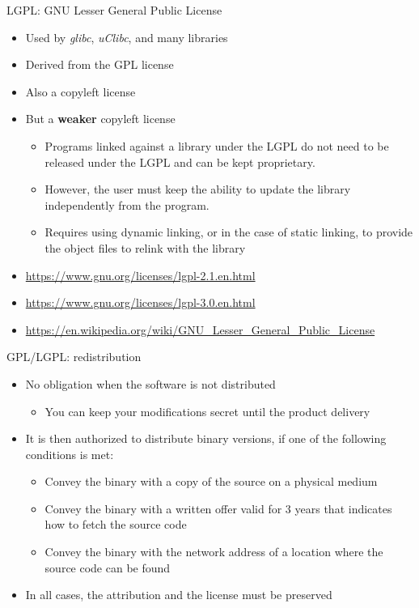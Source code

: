 \begin{frame}{LGPL: GNU Lesser General Public License}
  \begin{itemize}
  \item Used by {\em glibc}, {\em uClibc}, and many libraries
  \item Derived from the GPL license
  \item Also a copyleft license
  \item But a {\bf weaker} copyleft license
    \begin{itemize}
    \item Programs linked against a library under the LGPL do not need
      to be released under the LGPL and can be kept proprietary.
    \item However, the user must keep the ability to update the
      library independently from the program.
    \item Requires using dynamic linking, or in the case of static
      linking, to provide the object files to relink with the library
    \end{itemize}
  \item \url{https://www.gnu.org/licenses/lgpl-2.1.en.html}
  \item \url{https://www.gnu.org/licenses/lgpl-3.0.en.html}
  \item
    \url{https://en.wikipedia.org/wiki/GNU_Lesser_General_Public_License}
  \end{itemize}
\end{frame}

\begin{frame}{GPL/LGPL: redistribution}
  \begin{itemize}
  \item No obligation when the software is not distributed
    \begin{itemize}
    \item You can keep your modifications secret until the product
      delivery
    \end{itemize}
  \item It is then authorized to distribute binary versions, if one of
    the following conditions is met:
    \begin{itemize}
    \item Convey the binary with a copy of the source on a physical
      medium
    \item Convey the binary with a written offer valid for 3 years
      that indicates how to fetch the source code
    \item Convey the binary with the network address of a location
      where the source code can be found
    \end{itemize}
  \item In all cases, the attribution and the license must be
    preserved
  \end{itemize}
\end{frame}

